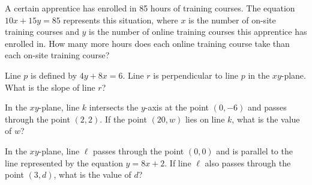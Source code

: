 \vspace{2em}

\noindent\markforreview

\vspace{1em}

A certain apprentice has enrolled in 85 hours of training courses. The equation $10x + 15y = 85$ represents this situation, where $x$ is the number of on-site training courses and $y$ is the number of online training courses this apprentice has enrolled in. How many more hours does each online training course take than each on-site training course?

\newpage
\noindent\markforreview

\vspace{1em}

Line $p$ is defined by $4y + 8x = 6$. Line $r$ is perpendicular to line $p$ in the $xy$-plane. What is the slope of line $r$?


\vspace{15em}

\noindent\markforreview

\vspace{1em}

In the $xy$-plane, line $k$ intersects the $y$-axis at the point $(0, -6)$ and passes through the point $(2, 2)$. If the point $(20, w)$ lies on line $k$, what is the value of $w$?


\vspace{15em}

\noindent\markforreview

\vspace{1em}

In the $xy$-plane, line $\ell$ passes through the point $(0, 0)$ and is parallel to the line represented by the equation $y = 8x + 2$. If line $\ell$ also passes through the point $(3, d)$, what is the value of $d$?

\vspace{2em}

\newpage
\noindent\markforreview

\vspace{1em}
\begin{center}
\end{center}
\vspace{0.75em}

